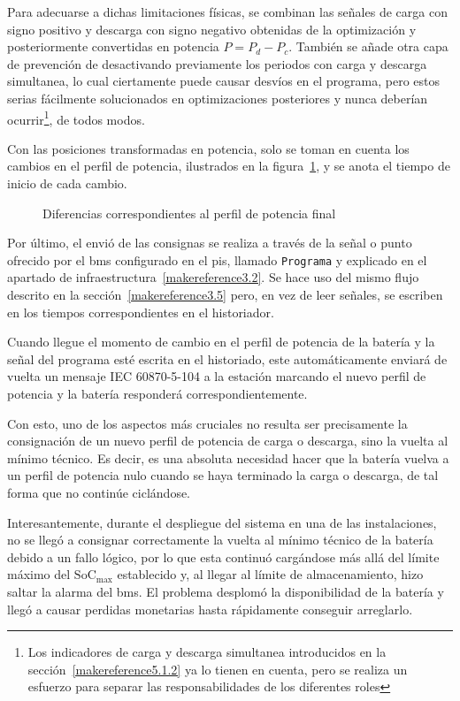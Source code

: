 Para adecuarse a dichas limitaciones físicas, se combinan las señales de carga con signo positivo y descarga con signo negativo obtenidas de la optimización y posteriormente convertidas en potencia \( P = P_{d} - P_{c} \). También se añade otra capa de prevención de desactivando previamente los periodos con carga y descarga simultanea, lo cual ciertamente puede causar desvíos en el programa, pero estos serias fácilmente solucionados en optimizaciones posteriores y nunca deberían ocurrir\footnote{Los indicadores de carga y descarga simultanea introducidos en la sección~\ref{makereference5.1.2} ya lo tienen en cuenta, pero se realiza un esfuerzo para separar las responsabilidades de los diferentes roles}, de todos modos.

Con las posiciones transformadas en potencia, solo se toman en cuenta los cambios en el perfil de potencia, ilustrados en la figura~\ref{fig:diferencia-perfil-potencia}, y se anota el tiempo de inicio de cada cambio.

\begin{figure}
  \centering
  \caption{Diferencias correspondientes al perfil de potencia final}
  \label{fig:diferencia-perfil-potencia}
\end{figure}

Por último, el envió de las consignas se realiza a través de la señal o punto ofrecido por el \gls{bms} configurado en el \gls{pis}, llamado \texttt{Programa} y explicado en el apartado de infraestructura~\ref{makereference3.2}. Se hace uso del mismo flujo descrito en la sección~\ref{makereference3.5} pero, en vez de leer señales, se escriben en los tiempos correspondientes en el historiador.

Cuando llegue el momento de cambio en el perfil de potencia de la batería y la señal del programa esté escrita en el historiado, este automáticamente enviará de vuelta un mensaje IEC 60870-5-104 a la estación marcando el nuevo perfil de potencia y la batería responderá correspondientemente.

Con esto, uno de los aspectos más cruciales no resulta ser precisamente la consignación de un nuevo perfil de potencia de carga o descarga, sino la vuelta al mínimo técnico. Es decir, es una absoluta necesidad hacer que la batería vuelva a un perfil de potencia nulo cuando se haya terminado la carga o descarga, de tal forma que no continúe ciclándose.

Interesantemente, durante el despliegue del sistema en una de las instalaciones, no se llegó a consignar correctamente la vuelta al mínimo técnico de la batería debido a un fallo lógico, por lo que esta continuó cargándose más allá del límite máximo del \( \mathrm{SoC}_{\text{max}} \) establecido y, al llegar al límite de almacenamiento, hizo saltar la alarma del \gls{bms}. El problema desplomó la disponibilidad de la batería y llegó a causar perdidas monetarias hasta rápidamente conseguir arreglarlo.

